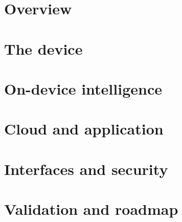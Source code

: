 \documentclass[11pt,a4paper]{article}
\begin{document}



\tableofcontents
\clearpage
\listoffigures
\listoftables
\clearpage



\clearpage
\part{Overview}




\clearpage
\part{The device}




\clearpage
\part{On-device intelligence}



\clearpage
\part{Cloud and application}




\clearpage
\part{Interfaces and security}



\clearpage
\part{Validation and roadmap}



\appendix




\printbibliography[heading=bibnumbered]
\end{document}
